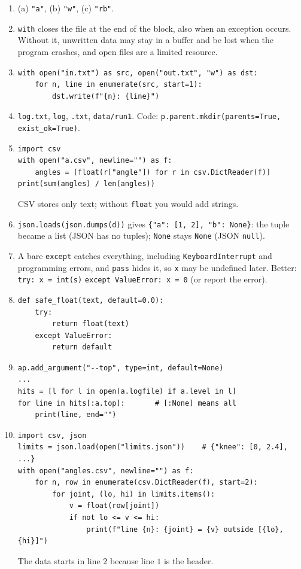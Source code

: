 \begin{enumerate}[label=\textbf{\ansnum.\arabic*}]
  \item (a) \texttt{"a"}, (b) \texttt{"w"}, (c) \texttt{"rb"}.
  \item \texttt{with} closes the file at the end of the block, also when an exception occurs. Without it, unwritten data may stay in a buffer and be lost when the program crashes, and open files are a limited resource.
  \item
\begin{verbatim}
with open("in.txt") as src, open("out.txt", "w") as dst:
    for n, line in enumerate(src, start=1):
        dst.write(f"{n}: {line}")
\end{verbatim}
  \item \texttt{log.txt}, \texttt{log}, \texttt{.txt}, \texttt{data/run1}. Code: \verb!p.parent.mkdir(parents=True, exist_ok=True)!.
  \item
\begin{verbatim}
import csv
with open("a.csv", newline="") as f:
    angles = [float(r["angle"]) for r in csv.DictReader(f)]
print(sum(angles) / len(angles))
\end{verbatim}
  CSV stores only text; without \texttt{float} you would add strings.
  \item \verb!json.loads(json.dumps(d))! gives \verb!{"a": [1, 2], "b": None}!: the tuple became a list (JSON has no tuples); \texttt{None} stays \texttt{None} (JSON \texttt{null}).
  \item A bare \texttt{except} catches everything, including \texttt{KeyboardInterrupt} and programming errors, and \texttt{pass} hides it, so \texttt{x} may be undefined later. Better: \verb!try: x = int(s)! \verb!except ValueError: x = 0! (or report the error).
  \item
\begin{verbatim}
def safe_float(text, default=0.0):
    try:
        return float(text)
    except ValueError:
        return default
\end{verbatim}
  \item
\begin{verbatim}
ap.add_argument("--top", type=int, default=None)
...
hits = [l for l in open(a.logfile) if a.level in l]
for line in hits[:a.top]:       # [:None] means all
    print(line, end="")
\end{verbatim}
  \item[\textbf{\ansnum.10}]
\begin{verbatim}
import csv, json
limits = json.load(open("limits.json"))    # {"knee": [0, 2.4], ...}
with open("angles.csv", newline="") as f:
    for n, row in enumerate(csv.DictReader(f), start=2):
        for joint, (lo, hi) in limits.items():
            v = float(row[joint])
            if not lo <= v <= hi:
                print(f"line {n}: {joint} = {v} outside [{lo}, {hi}]")
\end{verbatim}
  The data starts in line $2$ because line $1$ is the header.
\end{enumerate}

